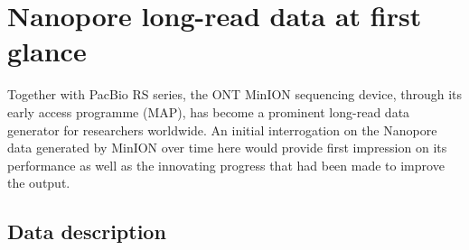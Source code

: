 \section{Nanopore long-read data at first glance}

Together with PacBio RS series, the ONT MinION sequencing device, through its early access programme (MAP), has become a prominent long-read data generator for researchers worldwide. 
An initial interrogation on the Nanopore data generated by MinION over time here would provide first impression on its performance as well as the innovating progress that had been made to improve the output. 

\subsection{Data description}

